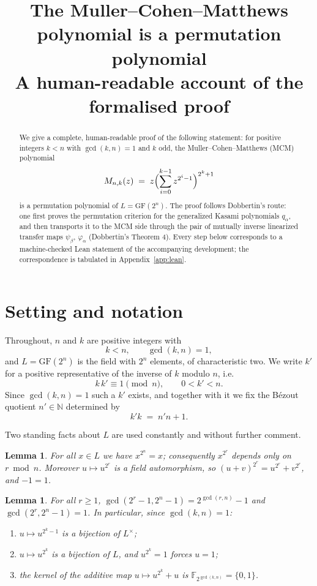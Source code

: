 \documentclass[11pt,a4paper]{article}
\title{The Muller--Cohen--Matthews polynomial is a permutation polynomial\\
\large A human-readable account of the formalised proof}
\author{}
\date{}
\newtheorem{lemma}[theorem]{Lemma}
\theoremstyle{definition}
\newcommand{\F}{\mathbb{F}}
\newcommand{\GF}{\mathrm{GF}}
\begin{document}
\maketitle

\begin{abstract}
We give a complete, human-readable proof of the following statement: for positive
integers $k<n$ with $\gcd(k,n)=1$ and $k$ odd, the Muller--Cohen--Matthews (MCM)
polynomial
\[
  M_{n,k}(z)\;=\;z\Bigl(\sum_{i=0}^{k-1}z^{2^{i}-1}\Bigr)^{2^{k}+1}
\]
is a permutation polynomial of $L=\GF(2^{n})$.  The proof follows Dobbertin's
route: one first proves the permutation criterion for the generalized Kasami
polynomials $q_\alpha$, and then transports it to the MCM side through the pair of
mutually inverse linearized transfer maps $\psi_\beta$, $\varphi_\alpha$
(Dobbertin's Theorem 4).  Every step below corresponds to a machine-checked Lean
statement of the accompanying development; the correspondence is tabulated in
Appendix~\ref{app:lean}.
\end{abstract}

\tableofcontents

\section{Setting and notation}

Throughout, $n$ and $k$ are positive integers with
\[
  k<n,\qquad \gcd(k,n)=1 ,
\]
and $L=\GF(2^{n})$ is the field with $2^{n}$ elements, of characteristic two.  We
write $k'$ for a positive representative of the inverse of $k$ modulo $n$, i.e.
\[
  k\,k'\equiv 1 \pmod n ,\qquad 0<k'<n .
\]
Since $\gcd(k,n)=1$ such a $k'$ exists, and together with it we fix the Bézout
quotient $n'\in\mathbb{N}$ determined by
\begin{equation}\label{eq:bezout}
  k'k \;=\; n'n+1 .
\end{equation}

Two standing facts about $L$ are used constantly and without further comment.

\begin{lemma}\label{lem:frob}
For all $x\in L$ we have $x^{2^{n}}=x$; consequently $x^{2^{r}}$ depends only on
$r\bmod n$.  Moreover $u\mapsto u^{2^{r}}$ is a field automorphism, so
$(u+v)^{2^{r}}=u^{2^{r}}+v^{2^{r}}$, and $-1=1$.
\end{lemma}

\begin{lemma}\label{lem:gcdpow}
For all $r\ge 1$, $\gcd(2^{r}-1,2^{n}-1)=2^{\gcd(r,n)}-1$ and
$\gcd(2^{r},2^{n}-1)=1$.  In particular, since $\gcd(k,n)=1$:
\begin{enumerate}
\item $u\mapsto u^{2^{k}-1}$ is a bijection of $L^{\times}$;
\item $u\mapsto u^{2^{k}}$ is a bijection of $L$, and $u^{2^{k}}=1$ forces $u=1$;
\item the kernel of the additive map $u\mapsto u^{2^{k}}+u$ is
      $\F_{2^{\gcd(k,n)}}=\{0,1\}$.
\end{enumerate}
\end{lemma}
\end{document}
